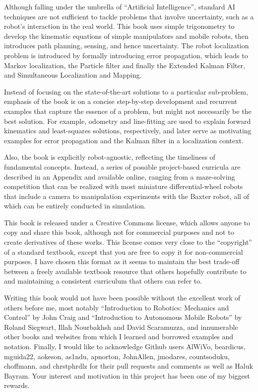 \documentclass[paper=6.14in:9.21in,pagesize=pdftex,11pt,twoside,openright]{scrbook}
\begin{document}
Although falling under the umbrella of ``Artificial Intelligence'', standard AI techniques are not sufficient to tackle problems that involve uncertainty, such as a robot's interaction in the real world. This book uses simple trigonometry to develop the kinematic equations of simple manipulators and mobile robots, then introduces path planning, sensing, and hence uncertainty. The robot localization problem is introduced by formally introducing error propagation, which leads to Markov localization, the Particle filter and finally the Extended Kalman Filter, and Simultaneous Localization and Mapping.

Instead of focusing on the state-of-the-art solutions to a particular sub-problem, emphasis of the book is on a concise step-by-step development and recurrent examples that capture the essence of a problem, but might not necessarily be the best solution. For example, odometry and line-fitting are used to explain forward kinematics and least-squares solutions, respectively, and later serve as motivating examples for error propagation and the Kalman filter in a localization context.

Also, the book is explicitly robot-agnostic, reflecting the timeliness of fundamental concepts. Instead, a series of possible project-based curricula are described in an Appendix and available online, ranging from a maze-solving competition that can be realized with most miniature differential-wheel robots that include a camera to manipulation experiments with the Baxter robot, all of which can be entirely conducted in simulation.

This book is released under a Creative Commons license, which allows anyone to copy and share this book, although not for commercial purposes and not to create derivatives of these works. This license comes very close to the ``copyright'' of a standard textbook, except that you are free to copy it for non-commercial purposes. I have chosen this format as it seems to maintain the best trade-off between a freely available textbook resource that others hopefully contribute to and maintaining a consistent curriculum that others can refer to.

Writing this book would not have been possible without the excellent work of others before me, most notably ``Introduction to Robotics: Mechanics and Control'' by John Craig and ``Introduction to Autonomous Mobile Robots'' by Roland Siegwart, Illah Nourbakhsh and David Scaramuzza, and innumerable other books and websites from which I learned and borrowed examples and notation. Finally, I would like to acknowledge Github users AlWiVo, beardicus, mguida22, aokeson, as1ndu, apnorton, JohnAllen, jmodares, countsoduku, choffmann, and chrstphrdlz for their pull requests and comments as well as Haluk Bayram. Your interest and motivation in this project has been one of my biggest rewards.
\end{document}
